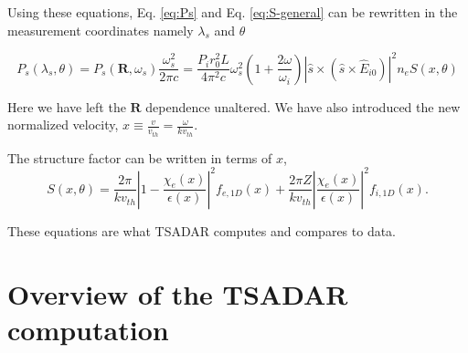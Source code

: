 \documentclass[11pt]{article}
\begin{document}
Using these equations, Eq. \ref{eq:Ps} and Eq. \ref{eq:S-general} can be rewritten in the measurement coordinates namely $\lambda_s$ and $\theta$

\begin{equation}\label{Pslambda}
    P_s(\lambda_s,\theta)=P_s(\textbf{R},\omega_s)\frac{\omega_s^2}{2\pi c}=\frac{P_i r_0^2 L}{4 \pi^2 c}\omega^2_s \left(1+\frac{2\omega}{\omega_i}\right) \left\vert \hat{s} \times \left(\hat{s} \times \hat{E}_{i0}\right)\right\vert^2 n_e S(x,\theta)
\end{equation}

Here we have left the $\mathbf{R}$ dependence unaltered. We have also introduced the new normalized velocity, $x\equiv \frac{v}{v_{th}}=\frac{\omega}{kv_{th}}$.

The structure factor can be written in terms of $x$,
\begin{equation}\label{Sx}
    S(x,\theta)=\frac{2\pi}{k v_{th}} \left\vert 1-\frac{\chi_e (x)}{\epsilon(x)}\right\vert^2 f_{e,1D}(x) +\frac{2\pi Z}{k v_{th}} \left\vert \frac{\chi_e(x)}{\epsilon(x)}\right\vert^2 f_{i,1D}(x).
\end{equation}

These equations are what TSADAR computes and compares to data.


\section{Overview of the TSADAR computation}\label{sec:overview}
\end{document}
